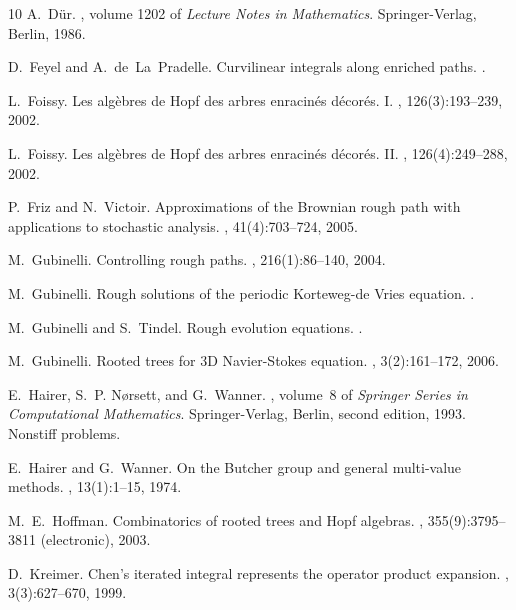 \documentclass[a4paper,11pt,reqno]{article}
\newcommand{\1}{{\bf 1}}
\begin{document}
\begin{thebibliography}{10}
A.~D{\"u}r.
, volume 1202 of {\em Lecture Notes in Mathematics}.
\newblock Springer-Verlag, Berlin, 1986.

D.~Feyel and A.~de~La~Pradelle.
\newblock Curvilinear integrals along enriched paths.
.

L.~Foissy.
\newblock Les alg\`ebres de {H}opf des arbres enracin\'es d\'ecor\'es. {I}.
, 126(3):193--239, 2002.

L.~Foissy.
\newblock Les alg\`ebres de {H}opf des arbres enracin\'es d\'ecor\'es. {II}.
, 126(4):249--288, 2002.

P.~Friz and N.~Victoir.
\newblock Approximations of the {B}rownian rough path with applications to
  stochastic analysis.
, 41(4):703--724,
  2005.

M.~Gubinelli.
\newblock Controlling rough paths.
, 216(1):86--140, 2004.

M.~Gubinelli.
\newblock Rough solutions of the periodic {K}orteweg-de {V}ries equation.
.

M.~Gubinelli and S.~Tindel.
\newblock Rough evolution equations.
.

M.~Gubinelli.
\newblock Rooted trees for 3{D} {N}avier-{S}tokes equation.
, 3(2):161--172, 2006.

E.~Hairer, S.~P. N{\o}rsett, and G.~Wanner.
, volume~8 of {\em
  Springer Series in Computational Mathematics}.
\newblock Springer-Verlag, Berlin, second edition, 1993.
\newblock Nonstiff problems.

E.~Hairer and G.~Wanner.
\newblock On the {B}utcher group and general multi-value methods.
, 13(1):1--15, 1974.

M.~E.~Hoffman.
\newblock Combinatorics of rooted trees and {H}opf algebras.
, 355(9):3795--3811 (electronic), 2003.

D.~Kreimer.
\newblock Chen's iterated integral represents the operator product expansion.
, 3(3):627--670, 1999.


\end{thebibliography}
\end{document}
